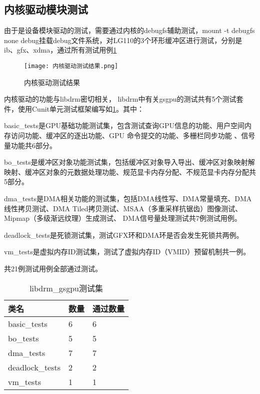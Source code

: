 \subsection{内核驱动模块测试}
由于是设备模块驱动的测试，需要通过内核的debugfs辅助测试，mount -t debugfs none debug挂载debug文件系统，对LG110的3个环形缓冲区进行测试，分别是
ib、gfx、xdma，通过所有测试用例\ref{fig:内核驱动测试结果}

\begin{figure}[H]
    \centering
    \texttt{[image: 内核驱动测试结果.png]}
    \caption{内核驱动测试结果}
    \label{fig:内核驱动测试结果}
\end{figure}

内核驱动的功能与libdrm密切相关，
libdrm中有关gsgpu的测试共有5个测试套件，使用Cunit单元测试框架编写如\ref{tab:libdrm_gsgpu测试集}。其中：

basic\_tests是GPU基础功能测试集，包含测试查询GPU信息的功能、用户空间内存访问功能、缓冲区的逐出功能、GPU 命令提交的功能、多栅栏同步功能 、信号量功能共6部分。

bo\_tests是缓冲区对象功能测试集，包括缓冲区对象导入导出、缓冲区对象映射解映射、缓冲区对象的元数据处理功能、规范显卡内存分配、不规范显卡内存分配共5部分。

dma\_tests是DMA相关功能的测试集，包括DMA线性写、DMA常量填充、DMA线性拷贝测试、DMA Tiled拷贝测试、MSAA（多重采样抗锯齿）图像测试、Mipmap（多级渐远纹理）生成测试、
DMA信号量处理测试共7例测试用例。

deadlock\_tests是死锁测试集，测试GFX环和DMA环是否会发生死锁共两例。

vm\_tests是虚拟内存ID测试集，测试了虚拟内存ID（VMID）预留机制共一例。

共21例测试用例全部通过测试。

\begin{table}[H]
    \centering
    \caption{libdrm\_gsgpu测试集}
    \label{tab:libdrm_gsgpu测试集}
    \begin{tabular}{lll}
      \toprule
      类名   &  数量  &通过数量\\
      \midrule
      basic\_tests & 6 & 6\\
      bo\_tests & 5 & 5\\
      dma\_tests & 7 & 7\\
      deadlock\_tests & 2 &2\\
      vm\_tests & 1 &1\\
      \bottomrule
    \end{tabular}
    \note{}
\end{table}

